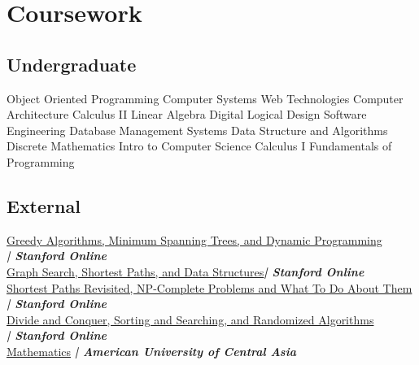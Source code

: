 \documentclass[]{deedy-resume-openfont}
\begin{document}
\begin{minipage}[t]{0.59\textwidth}

\section{Coursework}
\subsection{Undergraduate}
Object Oriented Programming\textbullet{}
Computer Systems \textbullet{}
Web Technologies \textbullet{}
Computer Architecture \textbullet{}
Calculus II \textbullet{}
Linear Algebra \textbullet{}
Digital Logical Design\textbullet{}
Software Engineering \textbullet{}
Database Management Systems \textbullet{}
Data Structure and Algorithms \textbullet{}
Discrete Mathematics \textbullet{}
Intro to Computer Science \textbullet{}
Calculus I \textbullet{}
Fundamentals of Programming 
\sectionsep


\subsection{External}



\href{https://www.coursera.org/account/accomplishments/verify/BBJ82ES293NF}{Greedy Algorithms, Minimum Spanning Trees, and
Dynamic Programming}\\
{\footnotesize \textit{\textbf{| Stanford Online}}} \\

\href{https://www.coursera.org/account/accomplishments/verify/8Y6GMJJ42MUR}{Graph Search, Shortest Paths, and Data Structures}{\footnotesize \textit{\textbf{| Stanford Online}}} \\
\href{https://www.coursera.org/account/accomplishments/verify/4HBNSGEQ6TZ4}{Shortest Paths Revisited, NP-Complete Problems
and What To Do About Them}
{\footnotesize \textit{\textbf{| Stanford Online}}} \\

\href{https://www.coursera.org/account/accomplishments/verify/9NLW95QA5L65}{Divide and Conquer, Sorting and Searching, and Randomized Algorithms} \\
{\footnotesize \textit{\textbf{| Stanford Online}}} \\

\href{https://auca.kg/en/cec_preparatorycourses/66/}{Mathematics}
{\footnotesize \textit{\textbf{| American University of Central Asia}}} \\


\end{minipage}
\end{document}
